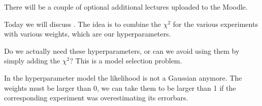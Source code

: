 \documentclass[main.tex]{subfiles}
\begin{document}

There will be a couple of optional additional lectures uploaded to the Moodle. 

Today we will discuss \cite[]{hobsonCombiningCosmologicalDatasets2002}.
The idea is to combine the \(\chi^2\) for the various experiments with various weights, which are our hyperparameters. 

Do we actually need these hyperparameters, or can we avoid using them by simply adding the \(\chi^2\)? This is a model selection problem. 

In the hyperparameter model the likelihood is not a Gaussian anymore. 
The weights must be larger than \(0\), we can take them to be larger than 1  if the corresponding experiment was overestimating its errorbars. 
\end{document}
